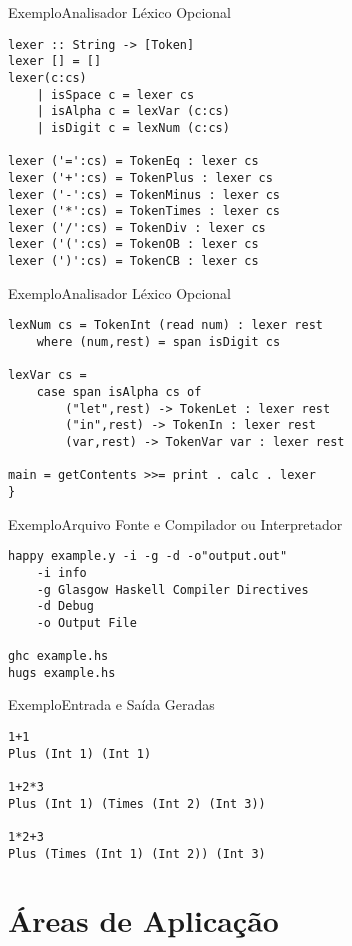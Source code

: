 \documentclass[hyperref={pdfpagelabels=false}]{beamer}
\begin{document}
\begin{frame}[fragile]{Exemplo}{Analisador Léxico Opcional}
\begin{verbatim}
lexer :: String -> [Token]
lexer [] = []
lexer(c:cs)
    | isSpace c = lexer cs
    | isAlpha c = lexVar (c:cs)
    | isDigit c = lexNum (c:cs)

lexer ('=':cs) = TokenEq : lexer cs
lexer ('+':cs) = TokenPlus : lexer cs
lexer ('-':cs) = TokenMinus : lexer cs
lexer ('*':cs) = TokenTimes : lexer cs
lexer ('/':cs) = TokenDiv : lexer cs
lexer ('(':cs) = TokenOB : lexer cs
lexer (')':cs) = TokenCB : lexer cs
\end{verbatim}
\end{frame}

\begin{frame}[fragile]{Exemplo}{Analisador Léxico Opcional}
\begin{verbatim}
lexNum cs = TokenInt (read num) : lexer rest
    where (num,rest) = span isDigit cs

lexVar cs =
    case span isAlpha cs of
        ("let",rest) -> TokenLet : lexer rest
        ("in",rest) -> TokenIn : lexer rest
        (var,rest) -> TokenVar var : lexer rest

main = getContents >>= print . calc . lexer
}
\end{verbatim}
\end{frame}

\begin{frame}[fragile]{Exemplo}{Arquivo Fonte e Compilador ou Interpretador}
\begin{verbatim}
happy example.y -i -g -d -o"output.out"
    -i info
    -g Glasgow Haskell Compiler Directives
    -d Debug
    -o Output File

ghc example.hs
hugs example.hs

\end{verbatim}
\end{frame}

\begin{frame}[fragile]{Exemplo}{Entrada e Saída Geradas}
\begin{verbatim}
1+1
Plus (Int 1) (Int 1)

1+2*3
Plus (Int 1) (Times (Int 2) (Int 3))

1*2+3
Plus (Times (Int 1) (Int 2)) (Int 3)
\end{verbatim}
\end{frame}

\section{Áreas de Aplicação}
\end{document}
